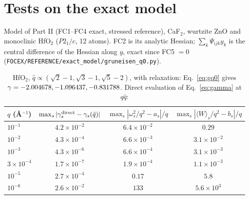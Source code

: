 \documentclass[11pt,a4paper]{article}
\begin{document}
\section{Tests on the exact model}\label{sec:grtest}
Model of Part II (FC1--FC4 exact, stressed reference), CaF$_2$, wurtzite ZnO and monoclinic HfO$_2$
($P2_1/c$, 12 atoms). FC2 is its analytic Hessian; $\sum_k\Psi_{ijk}y_k$ is the central difference of the
Hessian along $y$, exact since FC5 $=0$ (\texttt{FOCEX/REFERENCE/exact\_model/gruneisen\_q0.py}).
\begin{table}[h]
\centering
\caption{HfO$_2$, $\hat q\propto(\sqrt2-1,\sqrt3-1,\sqrt5-2)$, with relaxation: Eq.~\eqref{eq:gq0} gives
$\gamma=-2.004678,-1.096437,-0.831788$. Direct evaluation of Eq.~\eqref{eq:gamma} at $q\hat q$:}
\label{tab:grq}
\begin{tabular}{lccc}
\toprule
$q$ (\AA$^{-1}$) & $\max_s|\gamma^{\rm direct}_s-\gamma_s(\hat q)|$ & $\max_s|\omega_s^2/q^2-a_s|/q$ & $\max_s|\langle W\rangle_s/q^2-b_s|/q$\\
\midrule
$10^{-1}$ & $4.2\times10^{-2}$ & $6.4\times10^{-2}$ & $0.29$\\
$10^{-2}$ & $4.3\times10^{-4}$ & $6.6\times10^{-3}$ & $3.1\times10^{-2}$\\
$10^{-3}$ & $4.3\times10^{-6}$ & $6.6\times10^{-4}$ & $3.1\times10^{-3}$\\
$3\times10^{-4}$ & $1.7\times10^{-7}$ & $1.9\times10^{-4}$ & $1.1\times10^{-3}$\\
$10^{-5}$ & $2.7\times10^{-4}$ & $0.17$ & $5.8$\\
$10^{-6}$ & $2.6\times10^{-2}$ & $133$ & $5.6\times10^{3}$\\
\bottomrule
\end{tabular}
\end{table}
\end{document}
